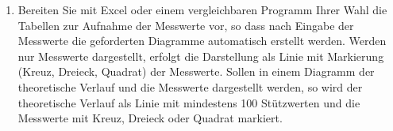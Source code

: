 \begin{enumerate}[label=\alph*)]
\pagebreak
  \item Bereiten Sie mit Excel oder einem vergleichbaren Programm Ihrer Wahl die Tabellen zur Aufnahme der Messwerte vor, so dass nach Eingabe der Messwerte die geforderten Diagramme automatisch erstellt werden. Werden nur Messwerte dargestellt, erfolgt die Darstellung als Linie mit Markierung (Kreuz, Dreieck, Quadrat) der Messwerte. Sollen in einem Diagramm der theoretische Verlauf und die Messwerte dargestellt werden, so wird der theoretische Verlauf als Linie mit mindestens 100 Stützwerten und die Messwerte mit Kreuz, Dreieck oder Quadrat markiert.  
\end{enumerate}
